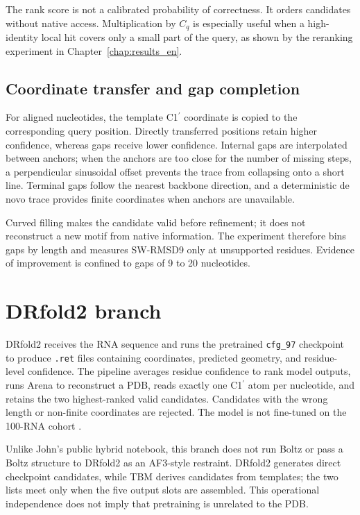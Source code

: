 \documentclass[12pt,a4paper,oneside]{report}
\newcommand{\cprime}{C1$^{\prime}$}
\begin{document}
The rank score is not a calibrated probability of correctness. It orders candidates
without native access. Multiplication by $C_q$ is especially useful when a high-identity
local hit covers only a small part of the query, as shown by the reranking experiment in
Chapter~\ref{chap:results_en}.

\subsection{Coordinate transfer and gap completion}

For aligned nucleotides, the template \cprime{} coordinate is copied to the corresponding
query position. Directly transferred positions retain higher confidence, whereas gaps
receive lower confidence. Internal gaps are interpolated between anchors; when the
anchors are too close for the number of missing steps, a perpendicular sinusoidal offset
prevents the trace from collapsing onto a short line. Terminal gaps follow the nearest
backbone direction, and a deterministic de novo trace provides finite coordinates when
anchors are unavailable.

Curved filling makes the candidate valid before refinement; it does not reconstruct a
new motif from native information. The experiment therefore bins gaps by length and
measures SW-RMSD9 only at unsupported residues. Evidence of improvement is confined to
gaps of 9 to 20 nucleotides.

\section{DRfold2 branch}

DRfold2 receives the RNA sequence and runs the pretrained \texttt{cfg\_97} checkpoint to
produce \texttt{.ret} files containing coordinates, predicted geometry, and residue-level
confidence. The pipeline averages residue confidence to rank model outputs, runs Arena
to reconstruct a PDB, reads exactly one \cprime{} atom per nucleotide, and retains the
two highest-ranked valid candidates. Candidates with the wrong length or non-finite
coordinates are rejected. The model is not fine-tuned on the 100-RNA cohort
\cite{drfold,drfold2}.

Unlike John's public hybrid notebook, this branch does not run Boltz or pass a Boltz
structure to DRfold2 as an AF3-style restraint. DRfold2 generates direct checkpoint
candidates, while TBM derives candidates from templates; the two lists meet only when
the five output slots are assembled. This operational independence does not imply that
pretraining is unrelated to the PDB.
\end{document}
